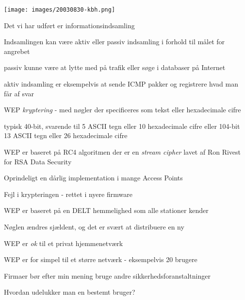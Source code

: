 
\begin{center}
\colorbox{white}{\texttt{[image: images/20030830-kbh.png]}}  
\end{center}




\begin{list1}
\item Det vi har udført er informationsindsamling
\item Indsamlingen kan være aktiv eller passiv indsamling i forhold
  til målet for angrebet
\item passiv kunne være at lytte med på trafik eller søge i databaser
  på Internet
\item aktiv indsamling er eksempelvis at sende ICMP pakker og
  registrere hvad man får af svar
\end{list1}


\begin{list1}
\item WEP \emph{kryptering} - med nøgler der specificeres som tekst
  eller hexadecimale cifre
\item typisk 40-bit, svarende til 5 ASCII tegn eller 10 hexadecimale
  cifre eller 104-bit 13 ASCII tegn eller 26 hexadecimale cifre
\item WEP er baseret på RC4 algoritmen der er en \emph{stream cipher}
  lavet af Ron Rivest for RSA Data Security
\end{list1}


\begin{list1}
\item Oprindeligt en dårlig implementation i mange Access Points
\item Fejl i krypteringen - rettet i nyere firmware
\item WEP er baseret på en DELT hemmelighed som alle stationer kender
\item Nøglen ændres sjældent, og det er svært at distribuere en ny
\end{list1}


\begin{list1}
\item WEP er \emph{ok} til et privat hjemmenetværk
\item WEP er for simpel til et større netværk - eksempelvis 20 brugere
\item Firmaer bør efter min mening bruge andre
  sikkerhedsforanstaltninger 
\item Hvordan udelukker man en bestemt bruger?
\end{list1}

